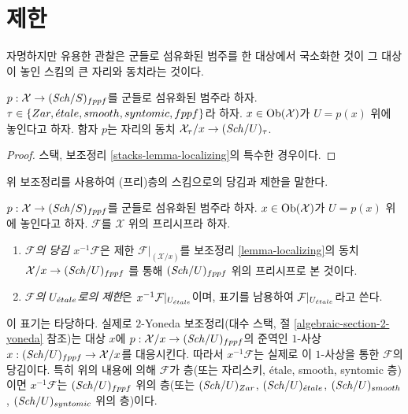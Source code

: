 \section{제한}
\label{section-restriction}


\noindent
자명하지만 유용한 관찰은 군들로 섬유화된 범주를 한 대상에서
국소화한 것이 그 대상이 놓인 스킴의 큰 자리와 동치라는 것이다.

\begin{lemma}
\label{lemma-localizing}
$p : \mathcal{X} \to (\mathit{Sch}/S)_{fppf}$를 군들로 섬유화된 범주라 하자.
$\tau \in \{Zar, {\acute{e}tale}, smooth, syntomic, fppf\}$라 하자.
$x \in \mathop{\mathrm{Ob}}\nolimits(\mathcal{X})$가 $U = p(x)$ 위에 놓인다고 하자.
함자 $p$는 자리의 동치
$\mathcal{X}_\tau/x \to (\mathit{Sch}/U)_\tau$.
\end{lemma}

\begin{proof}
스택, 보조정리 \ref{stacks-lemma-localizing}의 특수한 경우이다.
\end{proof}

\noindent
위 보조정리를 사용하여 (프리)층의 스킴으로의 당김과 제한을 말한다.

\begin{definition}
\label{definition-pullback}
$p : \mathcal{X} \to (\mathit{Sch}/S)_{fppf}$를 군들로 섬유화된 범주라 하자.
$x \in \mathop{\mathrm{Ob}}\nolimits(\mathcal{X})$가 $U = p(x)$ 위에 놓인다고 하자.
$\mathcal{F}$를 $\mathcal{X}$ 위의 프리시프라 하자.
\begin{enumerate}
\item {\it $\mathcal{F}$의 당김 $x^{-1}\mathcal{F}$}은 제한
$\mathcal{F}|_{(\mathcal{X}/x)}$를 보조정리
\ref{lemma-localizing}의 동치
$\mathcal{X}/x \to (\mathit{Sch}/U)_{fppf}$
를 통해 $(\mathit{Sch}/U)_{fppf}$ 위의 프리시프로 본 것이다.
\item {\it $\mathcal{F}$의 $U_{\acute{e}tale}$로의 제한}은
$x^{-1}\mathcal{F}|_{U_{\acute{e}tale}}$이며, 표기를 남용하여
$\mathcal{F}|_{U_{\acute{e}tale}}$라고 쓴다.
\end{enumerate}
\end{definition}

\noindent
이 표기는 타당하다. 실제로 $2$-Yoneda 보조정리(대수 스택, 절
\ref{algebraic-section-2-yoneda} 참조)는 대상 $x$에
$p : \mathcal{X}/x \to (\mathit{Sch}/U)_{fppf}$의 준역인 $1$-사상
$x : (\mathit{Sch}/U)_{fppf} \to \mathcal{X}/x$를 대응시킨다.
따라서 $x^{-1}\mathcal{F}$는 실제로 이 $1$-사상을 통한
$\mathcal{F}$의 당김이다. 특히 위의 내용에 의해 $\mathcal{F}$가
층(또는 자리스키, \'etale, smooth, syntomic 층)이면
$x^{-1}\mathcal{F}$는 $(\mathit{Sch}/U)_{fppf}$ 위의 층(또는
$(\mathit{Sch}/U)_{Zar}$, $(\mathit{Sch}/U)_{\acute{e}tale}$,
$(\mathit{Sch}/U)_{smooth}$, $(\mathit{Sch}/U)_{syntomic}$ 위의 층)이다.

